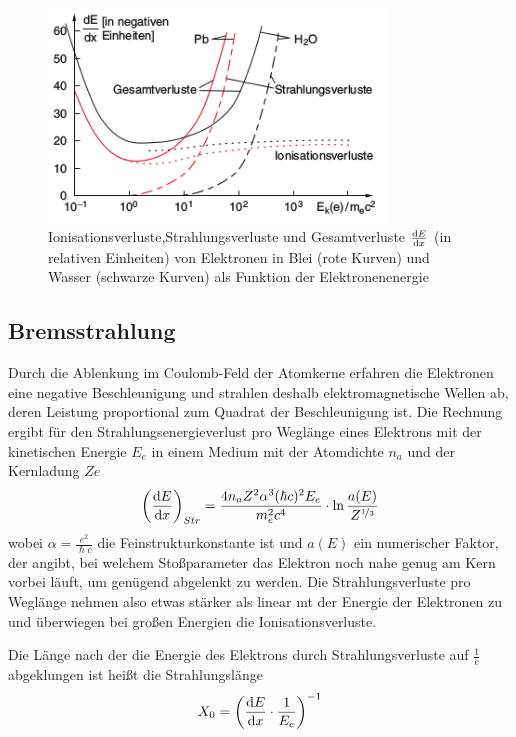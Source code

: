 \documentclass[Ex4_Zusammenfassung.tex]{subfiles}
\begin{document}
\begin{figure}[H]
	\centering
	\includegraphics[width=9cm]{Strahlungsverluste2.png}
	\caption{Ionisationsverluste,Strahlungsverluste und Gesamtverluste $ \frac{\mathrm{d} E}{\mathrm{d} x} $ (in relativen Einheiten) von Elektronen in Blei (rote Kurven) und Wasser (schwarze Kurven) als Funktion der Elektronenenergie}
\end{figure} 

\subsection{Bremsstrahlung}
Durch die Ablenkung im Coulomb-Feld der Atomkerne erfahren die Elektronen eine negative Beschleunigung und strahlen deshalb elektromagnetische Wellen ab, deren Leistung proportional zum Quadrat der Beschleunigung ist. Die Rechnung ergibt für den Strahlungsenergieverlust pro Weglänge eines Elektrons mit der kinetischen Energie $E_e$ in einem Medium mit der Atomdichte $n_a$ und der Kernladung $Ze$
\begin{equation}
	\left( \frac{\mathrm{d} E}{\mathrm{d} x} \right)_{Str} = \frac{4 n_a Z^2 \alpha^3 (\hslash c)^2 E_e}{m_e^2 c^4} \cdot \ln \frac{a(E)}{Z^{\nicefrac{1}{3}}} 
\end{equation}
wobei $\alpha = \frac{e^2}{\hslash c} $ die Feinstrukturkonstante ist und $a(E)$ ein numerischer Faktor, der angibt, bei welchem Stoßparameter das Elektron noch nahe genug am Kern vorbei läuft, um genügend abgelenkt zu werden. Die Strahlungsverluste pro Weglänge nehmen also etwas stärker als linear mt der Energie der Elektronen zu und überwiegen bei großen Energien die Ionisationsverluste.

Die Länge nach der die Energie des Elektrons durch Strahlungsverluste auf $\frac{1}{e} $ abgeklungen ist heißt die Strahlungslänge 
\begin{equation}
	X_0 = \left( \frac{\mathrm{d} E}{\mathrm{d} x} \cdot \frac{1}{E_e} \right)^{-1}
\end{equation}
\end{document}
